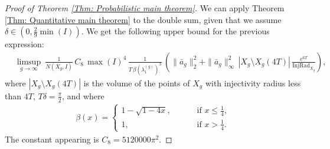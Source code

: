 \documentclass[11pt,twoside,reqno]{amsart} \usepackage{a4wide} \usepackage[T1]{fontenc} \usepackage[utf8]{inputenc} \usepackage{soul}  \usepackage{amsmath} \usepackage{amsfonts} \usepackage{amssymb} \usepackage{mathtools} \usepackage{amsthm} \usepackage{xcolor} \usepackage{graphicx} \usepackage{hyperref} \usepackage{standalone} \usepackage{esint} \usepackage{comment} \usepackage[left=2.3cm,top=3cm,right=2.3cm]{geometry} \usepackage{bm} \usepackage{svg} \usepackage{float} \numberwithin{equation}{section} \theoremstyle{plain} \newtheorem{thm}{Theorem}[section] \newtheorem{theorem}[thm]{Theorem} \newtheorem*{theorem*}{Theorem}\newtheorem{conj}[thm]{Conjecture} \newtheorem{lemma}[thm]{Lemma} \newtheorem{prop}[thm]{Proposition} \newtheorem{proposition}[thm]{Proposition} \newtheorem{cor}[thm]{Corollary} \newtheorem{question}[thm]{Question} \newtheorem{corollary}[thm]{Corollary} \newtheorem{assumption}[thm]{Assumption} \theoremstyle{definition} \newtheorem{defn}[thm]{Definition} \newtheorem{choice}[thm]{Choice} \newtheorem{definition}[thm]{Definition} \newtheorem{ex}[thm]{Example} \newtheorem{notation}[thm]{Notation} \newtheorem*{ack}{Acknowledgements} \theoremstyle{remark} \newtheorem{remark}[thm]{Remark} \newtheorem{bigremark}[thm]{Remark} \usepackage{xcolor} \newcommand{\red}[1]{ {\color{Red}#1} } \newcommand{\blue}[1]{ {\color{Blue}#1} } \author{Kai Hippi} \address{Aalto University, Espoo, Finland} \email{kai.hippi@aalto.fi}
\begin{document}
\begin{proof}[Proof of Theorem \ref{Thm: Probabilistic main theorem}]
	We can apply Theorem \ref{Thm: Quantitative main theorem} to the double sum, given that we assume $ \delta \in ( 0, \tfrac{2}{9} \min( I ) ) $. We get the following upper bound for the previous expression:
	\begin{align*}
		&
		\limsup_{g \to \infty} \ \frac{1}{N( X_{g}, I )} \, C_{8} \, \max( I )^{4} \, \frac{1}{T \, \beta( \lambda_{1}^{( g )} )^{3}} \, \left( \| \bar{a}_{g} \|_{2}^{2} +  \| \bar{a}_{g} \|_{\infty}^{2} \, | X_{g} \setminus X_{g}( 4T ) | \, \frac{e^{6T}}{ \operatorname{InjRad}_{X_{g}} } \right),	
	\end{align*}
	where $ | X_{g} \setminus X_{g}( 4T ) | $ is the volume of the points of $ X_{g} $ with injectivity radius less than $ 4T $, $ T \delta = \tfrac{\pi}{2} $, and where
	\begin{align*}
		\beta( x ) =
		\begin{cases}	
			1- \sqrt{1 - 4x}, \qquad & \text{ if } x \leq \frac{1}{4},
			\\
			1, \qquad & \text{ if } x > \frac{1}{4}.
		\end{cases}
	\end{align*}
	The constant appearing is $C_{8} = 5 120 000 \pi^{2}$.
	

\end{proof}
\end{document}
